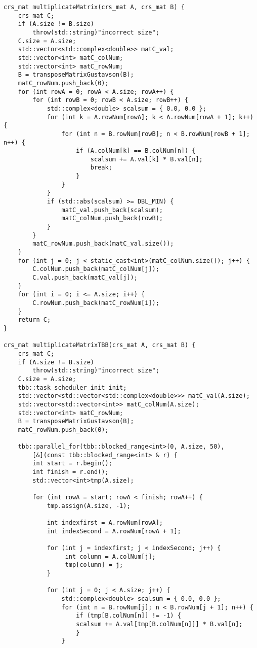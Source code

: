 \documentclass{report}
\begin{document}
\begin{lstlisting}
crs_mat multiplicateMatrix(crs_mat A, crs_mat B) {
    crs_mat C;
    if (A.size != B.size)
        throw(std::string)"incorrect size";
    C.size = A.size;
    std::vector<std::complex<double>> matC_val;
    std::vector<int> matC_colNum;
    std::vector<int> matC_rowNum;
    B = transposeMatrixGustavson(B);
    matC_rowNum.push_back(0);
    for (int rowA = 0; rowA < A.size; rowA++) {
        for (int rowB = 0; rowB < A.size; rowB++) {
            std::complex<double> scalsum = { 0.0, 0.0 };
            for (int k = A.rowNum[rowA]; k < A.rowNum[rowA + 1]; k++) {
                for (int n = B.rowNum[rowB]; n < B.rowNum[rowB + 1]; n++) {
                    if (A.colNum[k] == B.colNum[n]) {
                        scalsum += A.val[k] * B.val[n];
                        break;
                    }
                }
            }
            if (std::abs(scalsum) >= DBL_MIN) {
                matC_val.push_back(scalsum);
                matC_colNum.push_back(rowB);
            }
        }
        matC_rowNum.push_back(matC_val.size());
    }
    for (int j = 0; j < static_cast<int>(matC_colNum.size()); j++) {
        C.colNum.push_back(matC_colNum[j]);
        C.val.push_back(matC_val[j]);
    }
    for (int i = 0; i <= A.size; i++) {
        C.rowNum.push_back(matC_rowNum[i]);
    }
    return C;
}

crs_mat multiplicateMatrixTBB(crs_mat A, crs_mat B) {
    crs_mat C;
    if (A.size != B.size)
        throw(std::string)"incorrect size";
    C.size = A.size;
    tbb::task_scheduler_init init;
    std::vector<std::vector<std::complex<double>>> matC_val(A.size);
    std::vector<std::vector<int>> matC_colNum(A.size);
    std::vector<int> matC_rowNum;
    B = transposeMatrixGustavson(B);
    matC_rowNum.push_back(0);

    tbb::parallel_for(tbb::blocked_range<int>(0, A.size, 50),
        [&](const tbb::blocked_range<int> & r) {
        int start = r.begin();
        int finish = r.end();
        std::vector<int>tmp(A.size);

        for (int rowA = start; rowA < finish; rowA++) {
            tmp.assign(A.size, -1);

            int indexfirst = A.rowNum[rowA];
            int indexSecond = A.rowNum[rowA + 1];

            for (int j = indexfirst; j < indexSecond; j++) {
                 int column = A.colNum[j];
                 tmp[column] = j;
            }

            for (int j = 0; j < A.size; j++) {
                std::complex<double> scalsum = { 0.0, 0.0 };
                for (int n = B.rowNum[j]; n < B.rowNum[j + 1]; n++) {
                    if (tmp[B.colNum[n]] != -1) {
                    scalsum += A.val[tmp[B.colNum[n]]] * B.val[n];
                    }
                }


\end{lstlisting}
\end{document}
